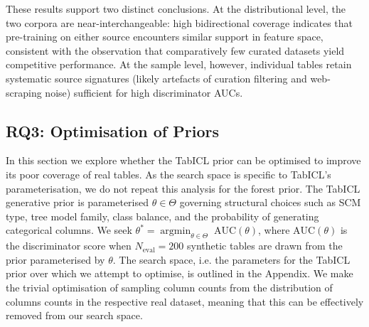 \documentclass{article}
\newcommand{\nsa}[1]{\textcolor{blue!50!black}{\textsf{}{NSA:~~#1}}}
\begin{document}
These results support two distinct conclusions. At the distributional level, the two corpora are near-interchangeable: high bidirectional coverage indicates that pre-training on either source encounters similar support in feature space, consistent with the observation that comparatively few curated datasets yield competitive performance.
At the sample level, however, individual tables retain systematic source signatures (likely artefacts of curation filtering and web-scraping noise) sufficient for high discriminator AUCs.





\subsection{RQ3: Optimisation of Priors}
\label{sec:optimisation}


In this section we explore whether the TabICL prior can be optimised to improve its poor coverage of real tables. As the search space is specific to TabICL's parameterisation, we do not repeat this analysis for the forest prior.
The TabICL generative prior is parameterised $\theta \in \Theta$ governing structural choices such as SCM type, tree model family, class balance, and the probability of generating categorical columns.
We seek
    $\theta^* = \operatorname*{argmin}_{\theta \in \Theta}\; \text{AUC}(\theta)$,
where $\text{AUC}(\theta)$ is the discriminator score when $N_{\text{eval}} = 200$ synthetic tables are drawn from the prior parameterised by $\theta$. 
The search space, i.e. the parameters for the TabICL prior over which we attempt to optimise, is outlined in the Appendix.
We make the trivial optimisation of sampling column counts from the distribution of columns counts in the respective real dataset, meaning that this can be effectively removed from our search space.
\end{document}

